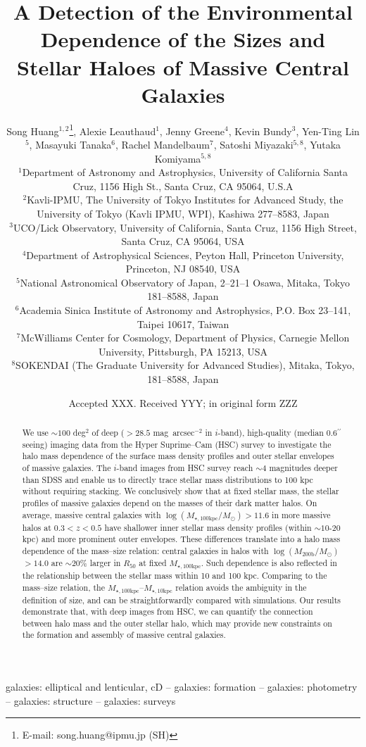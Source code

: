 \documentclass[a4paper,fleqn,usenatbib]{mnras}
\title[Structure and Environment of Massive Galaxies]{
       A Detection of the Environmental Dependence of the Sizes and Stellar Haloes
       of Massive Central Galaxies}
\author[S. Huang et al.]{
        Song Huang$^{1,2}$\thanks{E-mail: song.huang@ipmu.jp (SH)},
        Alexie Leauthaud$^{1}$,
        Jenny Greene$^{4}$,
        Kevin Bundy$^{3}$,
        \newauthor
        Yen-Ting Lin$^{5}$,
        Masayuki Tanaka$^{6}$,
        Rachel Mandelbaum$^{7}$,
        Satoshi Miyazaki$^{5,8}$,
        \newauthor
        Yutaka Komiyama$^{5,8}$
        \\
        $^{1}$Department of Astronomy and Astrophysics, University of California 
              Santa Cruz, 1156 High St., Santa Cruz, CA 95064, U.S.A\\
        $^{2}$Kavli-IPMU, The University of Tokyo Institutes for Advanced Study, 
              the University of Tokyo (Kavli IPMU, WPI), Kashiwa 277--8583, Japan\\              
        $^{3}$UCO/Lick Observatory, University of California, Santa Cruz,
              1156 High Street, Santa Cruz, CA 95064, USA\\
        $^{4}$Department of Astrophysical Sciences, Peyton Hall,
              Princeton University, Princeton, NJ 08540, USA \\
        $^{5}$National Astronomical Observatory of Japan, 2--21--1 Osawa, Mitaka, 
              Tokyo 181--8588, Japan\\
        $^{6}$Academia Sinica Institute of Astronomy and Astrophysics, 
              P.O. Box 23--141, Taipei 10617, Taiwan\\
        $^{7}$McWilliams Center for Cosmology, Department of Physics, 
              Carnegie Mellon University, Pittsburgh, PA 15213, USA\\
        $^{8}$SOKENDAI (The Graduate University for Advanced Studies), Mitaka,
              Tokyo, 181--8588, Japan
        }
\date{Accepted XXX. Received YYY; in original form ZZZ}
\def\asec{$^{\prime\prime}$}
\def\sb{mag~arcsec$^{-2}$}
\def\logmh{{$\log (M_{\mathrm{200b}}/M_{\odot})$}}
\def\minn{{$M_{\star,10\mathrm{kpc}}$}}
\def\mtot{{$M_{\star,100\mathrm{kpc}}$}}
\def\logmtot{{$\log (M_{\star,100\mathrm{kpc}}/M_{\odot})$}}
\begin{document}
\label{firstpage}
\pagerange{\pageref{firstpage}--\pageref{lastpage}}

\maketitle


\begin{abstract}  

    We use ${\sim}100$ deg$^2$ of deep ($>28.5$ \sb{} in $i$-band), high-quality 
    (median 0.6\asec seeing) imaging data from the Hyper Suprime--Cam (HSC) survey 
    to investigate the halo mass dependence of the surface mass density profiles 
    and outer stellar envelopes of massive galaxies. 
    The $i$-band images from HSC survey reach ${\sim}4$ magnitudes deeper than SDSS 
    and enable us to directly trace stellar mass distributions to 100 kpc without 
    requiring stacking.  
    We conclusively show that at fixed stellar mass, the stellar profiles of massive 
    galaxies depend on the masses of their dark matter halos. 
    On average, massive central galaxies with \logmtot{}$>11.6$ in more massive halos 
    at $0.3 < z < 0.5$ have shallower inner stellar mass density profiles 
    (within ${\sim}10$-$20$ kpc) and more prominent outer envelopes. 
    These differences translate into a halo mass dependence of the 
    mass--size relation: central galaxies in halos with \logmh{}$>14.0$ are 
    $\sim 20$\% larger in $R_{\mathrm{50}}$ at fixed \mtot{}.  
    Such dependence is also reflected in the relationship between the stellar mass 
    within 10 and 100 kpc. 
    Comparing to the mass--size relation, the \mtot{}--\minn{} relation avoids the 
    ambiguity in the definition of size, and can be straightforwardly compared with 
    simulations. 
    Our results demonstrate that, with deep images from HSC, we can quantify the 
    connection between halo mass and the outer stellar halo, which may provide new 
    constraints on the formation and assembly of massive central galaxies.
    
\end{abstract}

\begin{keywords}
    galaxies: elliptical and lenticular, cD --
    galaxies: formation --
    galaxies: photometry -- 
    galaxies: structure -- 
    galaxies: surveys
\end{keywords}
\end{document}
